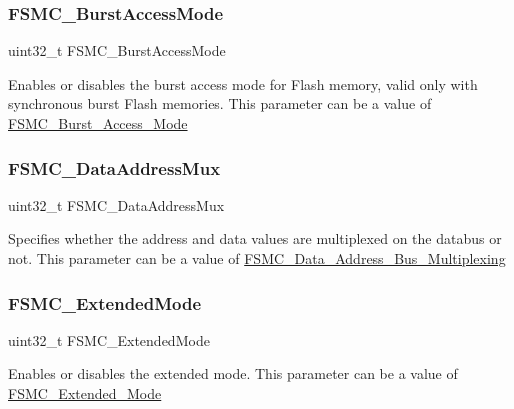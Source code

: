 \subsubsection{\texorpdfstring{FSMC\_BurstAccessMode}{FSMC\_BurstAccessMode}}
{\footnotesize\ttfamily uint32\+\_\+t F\+S\+M\+C\+\_\+\+Burst\+Access\+Mode}

Enables or disables the burst access mode for Flash memory, valid only with synchronous burst Flash memories. This parameter can be a value of \mbox{\hyperlink{group___f_s_m_c___burst___access___mode}{F\+S\+M\+C\+\_\+\+Burst\+\_\+\+Access\+\_\+\+Mode}} \mbox{\label{struct_f_s_m_c___n_o_r_s_r_a_m_init_type_def_a543a5c385820244e5f3b5a96b3b79f46}} 
\subsubsection{\texorpdfstring{FSMC\_DataAddressMux}{FSMC\_DataAddressMux}}
{\footnotesize\ttfamily uint32\+\_\+t F\+S\+M\+C\+\_\+\+Data\+Address\+Mux}

Specifies whether the address and data values are multiplexed on the databus or not. This parameter can be a value of \mbox{\hyperlink{group___f_s_m_c___data___address___bus___multiplexing}{F\+S\+M\+C\+\_\+\+Data\+\_\+\+Address\+\_\+\+Bus\+\_\+\+Multiplexing}} \mbox{\label{struct_f_s_m_c___n_o_r_s_r_a_m_init_type_def_a3726a70e62c3e7d5172296e88d36cfe4}} 
\subsubsection{\texorpdfstring{FSMC\_ExtendedMode}{FSMC\_ExtendedMode}}
{\footnotesize\ttfamily uint32\+\_\+t F\+S\+M\+C\+\_\+\+Extended\+Mode}

Enables or disables the extended mode. This parameter can be a value of \mbox{\hyperlink{group___f_s_m_c___extended___mode}{F\+S\+M\+C\+\_\+\+Extended\+\_\+\+Mode}} \mbox{\label{struct_f_s_m_c___n_o_r_s_r_a_m_init_type_def_aa89fb8c812e5ef7800eef9574dcb972d}} 
